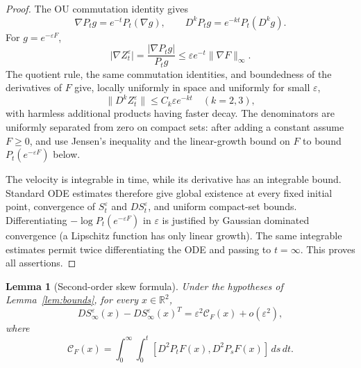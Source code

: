 \documentclass[11pt]{article}
\newtheorem{lemma}[theorem]{Lemma}
\newcommand{\R}{\mathbb R}
\newcommand{\Hess}{D^2}
\newcommand{\comm}[2]{[#1,#2]}
\begin{document}
\begin{proof}
The OU commutation identity gives
\[
 \nabla P_tg=e^{-t}P_t(\nabla g),\qquad
 D^kP_tg=e^{-kt}P_t(D^kg).
\]
For $g=e^{-\varepsilon F}$,
\[
 \lvert\nabla Z_t^\varepsilon\rvert
 =\frac{\lvert\nabla P_tg\rvert}{P_tg}
 \leq \varepsilon e^{-t}\lVert\nabla F\rVert_\infty.
\]
The quotient rule, the same commutation identities, and boundedness of the
derivatives of $F$ give, locally uniformly in space and uniformly for small
$\varepsilon$,
\[
 \lVert D^kZ_t^\varepsilon\rVert\leq C_k\varepsilon e^{-kt}
 \quad(k=2,3),
\]
with harmless additional products having faster decay.  The denominators are
uniformly separated from zero on compact sets: after adding a constant assume
$F\geq0$, and use Jensen's inequality and the linear-growth bound on $F$ to
bound $P_t(e^{-\varepsilon F})$ below.

The velocity is integrable in time, while its derivative has an integrable
bound. Standard ODE estimates therefore give global existence at every fixed
initial point, convergence of $S_t^\varepsilon$ and $DS_t^\varepsilon$, and
uniform compact-set bounds. Differentiating
$-\log P_t(e^{-\varepsilon F})$ in $\varepsilon$ is justified by Gaussian
dominated convergence (a Lipschitz function has only linear growth). The same
integrable estimates permit twice differentiating the ODE and passing to
$t=\infty$. This proves all assertions.
\end{proof}

\begin{lemma}[Second-order skew formula]\label{lem:skew}
Under the hypotheses of Lemma~\ref{lem:bounds}, for every $x\in\R^2$,
\begin{equation}\label{eq:skew}
 DS_\infty^\varepsilon(x)-DS_\infty^\varepsilon(x)^T
 =\varepsilon^2\mathcal C_F(x)+o(\varepsilon^2),
\end{equation}
where
\begin{equation}\label{eq:C}
 \mathcal C_F(x)=
 \int_0^\infty\int_0^t
 \comm{\Hess P_tF(x)}{\Hess P_sF(x)}\,ds\,dt.
\end{equation}
\end{lemma}
\end{document}
